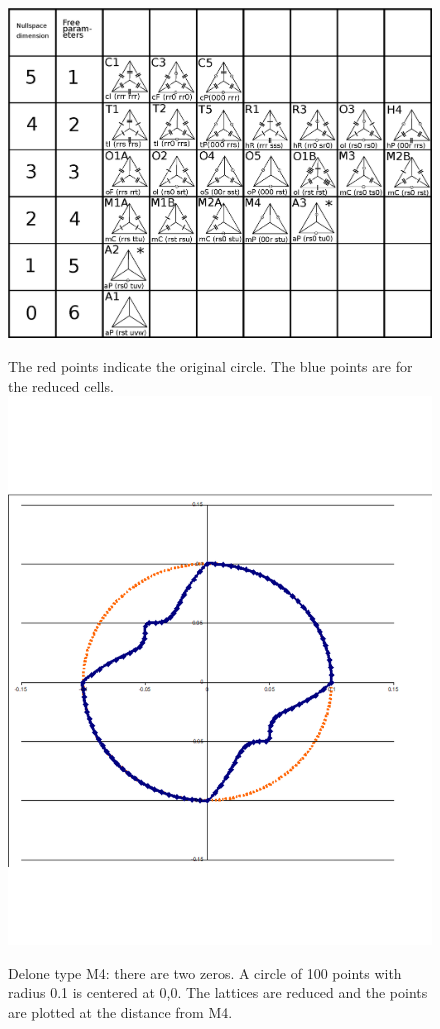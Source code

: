 \documentclass[preprint]{iucr}              %
\begin{document}
	\begin{figure}
		\caption{}
		\label{fig:degenerate}
		\includegraphics[width=12cm]{NullSpaceDistribution}
	\end{figure}
	
	\begin{figure}
		\label{fig:M4}
		\caption{Delone type M4: there are two zeros. A circle of 100 points with
			radius 0.1 is centered at 0,0. The lattices are reduced and the points are
			plotted at the distance from M4.} The red points indicate the original
		circle. The blue points are for the reduced cells.
		\includegraphics[width=12cm]{M4-100-2-zeros}
	\end{figure}
	
\end{document}
